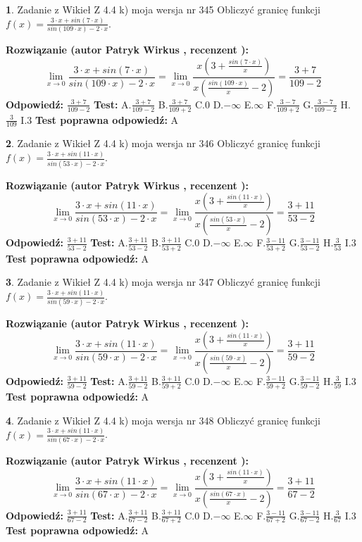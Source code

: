 \documentclass[12pt, a4paper]{article}
\theoremstyle{definition} %
\newtheorem{zad}{}
\newcommand{\zadStart}[1]{\begin{zad}#1\newline}
\newcommand{\zadStop}{\end{zad}}
\newcommand{\rozwStart}[2]{\noindent \textbf{Rozwiązanie (autor #1 , recenzent #2): }\newline}
\newcommand{\rozwStop}{\newline}
\newcommand{\odpStart}{\noindent \textbf{Odpowiedź:}\newline}
\newcommand{\odpStop}{\newline}
\newcommand{\testStart}{\noindent \textbf{Test:}\newline}
\newcommand{\testStop}{\newline}
\newcommand{\kluczStart}{\noindent \textbf{Test poprawna odpowiedź:}\newline}
\newcommand{\kluczStop}{\newline}
\begin{document}
\zadStart{Zadanie z Wikieł Z 4.4 k) moja wersja nr 345}
Obliczyć granicę funkcji $f(x)=\frac{3\cdot x +sin(7\cdot x)}{sin(109\cdot x) -2\cdot x}$.
\zadStop
\rozwStart{Patryk Wirkus}{}
$$\lim\limits_{x\to 0}\frac{3\cdot x +sin(7\cdot x)}{sin(109\cdot x) -2\cdot x}
=\lim\limits_{x\to 0}\frac{x(3+\frac{sin(7\cdot x)}{x})}{x(\frac{sin(109\cdot x)}{x}-2)}
=\frac{3+7}{109-2}$$
\rozwStop
\odpStart
$\frac{3+7}{109-2}$
\odpStop
\testStart
A.$\frac{3+7}{109-2}$
B.$\frac{3+7}{109+2}$
C.$0$
D.$-\infty$
E.$\infty$
F.$\frac{3-7}{109+2}$
G.$\frac{3-7}{109-2}$
H.$\frac{3}{109}$
I.$3$
\testStop
\kluczStart
A
\kluczStop



\zadStart{Zadanie z Wikieł Z 4.4 k) moja wersja nr 346}
Obliczyć granicę funkcji $f(x)=\frac{3\cdot x +sin(11\cdot x)}{sin(53\cdot x) -2\cdot x}$.
\zadStop
\rozwStart{Patryk Wirkus}{}
$$\lim\limits_{x\to 0}\frac{3\cdot x +sin(11\cdot x)}{sin(53\cdot x) -2\cdot x}
=\lim\limits_{x\to 0}\frac{x(3+\frac{sin(11\cdot x)}{x})}{x(\frac{sin(53\cdot x)}{x}-2)}
=\frac{3+11}{53-2}$$
\rozwStop
\odpStart
$\frac{3+11}{53-2}$
\odpStop
\testStart
A.$\frac{3+11}{53-2}$
B.$\frac{3+11}{53+2}$
C.$0$
D.$-\infty$
E.$\infty$
F.$\frac{3-11}{53+2}$
G.$\frac{3-11}{53-2}$
H.$\frac{3}{53}$
I.$3$
\testStop
\kluczStart
A
\kluczStop



\zadStart{Zadanie z Wikieł Z 4.4 k) moja wersja nr 347}
Obliczyć granicę funkcji $f(x)=\frac{3\cdot x +sin(11\cdot x)}{sin(59\cdot x) -2\cdot x}$.
\zadStop
\rozwStart{Patryk Wirkus}{}
$$\lim\limits_{x\to 0}\frac{3\cdot x +sin(11\cdot x)}{sin(59\cdot x) -2\cdot x}
=\lim\limits_{x\to 0}\frac{x(3+\frac{sin(11\cdot x)}{x})}{x(\frac{sin(59\cdot x)}{x}-2)}
=\frac{3+11}{59-2}$$
\rozwStop
\odpStart
$\frac{3+11}{59-2}$
\odpStop
\testStart
A.$\frac{3+11}{59-2}$
B.$\frac{3+11}{59+2}$
C.$0$
D.$-\infty$
E.$\infty$
F.$\frac{3-11}{59+2}$
G.$\frac{3-11}{59-2}$
H.$\frac{3}{59}$
I.$3$
\testStop
\kluczStart
A
\kluczStop



\zadStart{Zadanie z Wikieł Z 4.4 k) moja wersja nr 348}
Obliczyć granicę funkcji $f(x)=\frac{3\cdot x +sin(11\cdot x)}{sin(67\cdot x) -2\cdot x}$.
\zadStop
\rozwStart{Patryk Wirkus}{}
$$\lim\limits_{x\to 0}\frac{3\cdot x +sin(11\cdot x)}{sin(67\cdot x) -2\cdot x}
=\lim\limits_{x\to 0}\frac{x(3+\frac{sin(11\cdot x)}{x})}{x(\frac{sin(67\cdot x)}{x}-2)}
=\frac{3+11}{67-2}$$
\rozwStop
\odpStart
$\frac{3+11}{67-2}$
\odpStop
\testStart
A.$\frac{3+11}{67-2}$
B.$\frac{3+11}{67+2}$
C.$0$
D.$-\infty$
E.$\infty$
F.$\frac{3-11}{67+2}$
G.$\frac{3-11}{67-2}$
H.$\frac{3}{67}$
I.$3$
\testStop
\kluczStart
A
\kluczStop
\end{document}
